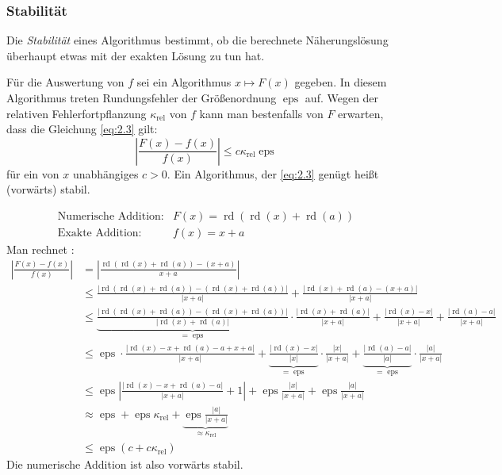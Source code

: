 \documentclass[a4paper]{scrartcl}
\numberwithin{equation}{section}
\DeclareMathOperator{\rd}{rd}
\renewcommand{\eps}{\operatorname{eps}}
\newcommand{\kondrel}{\kappa_{\text{rel}}}
\begin{document}
\subsubsection{Stabilität}

Die \emph{Stabilität} eines Algorithmus bestimmt, ob die berechnete Näherungslösung überhaupt etwas mit der exakten Lösung zu tun hat.

Für die Auswertung von $f$ sei ein Algorithmus $x\mapsto F(x)$ gegeben.
In diesem Algorithmus treten Rundungsfehler der Größenordnung $\eps$ auf.
Wegen der relativen Fehlerfortpflanzung $\kondrel$ von $f$ kann man bestenfalls von $F$ erwarten, dass die Gleichung \eqref{eq:2.3} gilt:
\begin{equation}
\label{eq:2.3}
\left|\frac{F(x)-f(x)}{f(x)}\right|\le c\kondrel\eps
\end{equation}
für ein von $x$ unabhängiges $c>0$.
Ein Algorithmus, der \eqref{eq:2.3} genügt heißt (vorwärts) stabil.

\begin{ex}
\label{ex:2.5}
\begin{align*}
\text{Numerische Addition:} &F(x)= \rd(\rd(x)+\rd(a))\\
\text{Exakte Addition:} &f(x) = x+a
\end{align*}
Man rechnet :
\begin{align*}
\left|\frac{F(x)-f(x)}{f(x)}\right|
&=\left|\frac{\rd(\rd(x)+\rd(a))-(x+a)}{x+a}\right|\\
&\le \frac{|\rd(\rd(x)+\rd(a))-(\rd(x)+\rd(a))|}{|x+a|} + \frac{|\rd(x)+\rd(a)-(x+a)|}{|x+a|}\\
&\le \underbrace{\frac{|\rd(\rd(x)+\rd(a))-(\rd(x)+\rd(a))|}{|\rd(x)+\rd(a)|}}_{=\eps} \cdot \frac{|\rd(x)+\rd(a)|}{|x+a|} + \frac{|\rd(x)-x|}{|x+a|}+\frac{|\rd(a)-a|}{|x+a|}\\
&\le \eps\cdot\frac{|\rd(x)-x +\rd(a)-a +x+a|}{|x+a|}+\underbrace{\frac{|\rd(x)-x|}{|x|}}_{=\eps}\cdot\frac{|x|}{|x+a|}+\underbrace{\frac{|\rd(a)-a|}{|a|}}_{=\eps}\cdot \frac{|a|}{|x+a|}\\
&\le \eps\left|\frac{|\rd(x)-x+\rd(a)-a|}{|x+a|}+1\right|+\eps\frac{|x|}{|x+a|}+\eps\frac{|a|}{|x+a|}\\
&\approx \eps +\eps\kondrel +\underbrace{\eps\frac{|a|}{|x+a|}}_{\approx \kondrel}\\
&\le \eps(c+c\kondrel)
\end{align*}
Die numerische Addition ist also vorwärts stabil.
\end{ex}
\end{document}
